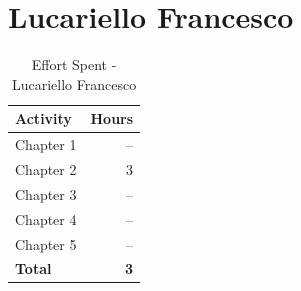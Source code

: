 \section{Lucariello Francesco}
\begin{table}[H]
\centering
\begin{tabular}{|l|r|}
\hline
\textbf{Activity} & \textbf{Hours} \\ \hline
Chapter 1 & -- \\ \hline
Chapter 2 & 3 \\ \hline
Chapter 3 & -- \\ \hline
Chapter 4 & -- \\ \hline
Chapter 5 & -- \\ \hline
\textbf{Total} & \textbf{3} \\ \hline
\end{tabular}
\caption{Effort Spent - Lucariello Francesco}
\end{table}
